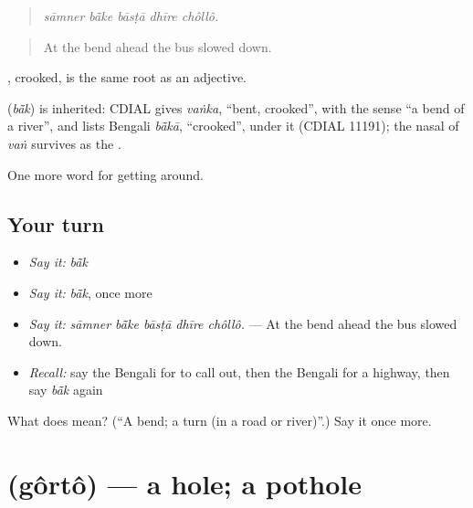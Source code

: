 \begin{quote}
    
\end{quote}

\begin{quote}
\emph{sāmner bā̃ke bāsṭā dhīre chôllô.}
\end{quote}

\begin{quote}
At the bend ahead the bus slowed down.
\end{quote}

, crooked, is the same root as an adjective.

\begin{cousinweb}
\textbf{} (\emph{bā̃k}) is inherited: CDIAL gives \emph{vaṅka}, \textquotedblleft{}bent, crooked\textquotedblright{}, with the sense \textquotedblleft{}a bend of a river\textquotedblright{}, and lists Bengali \emph{bā̃kā}, \textquotedblleft{}crooked\textquotedblright{}, under it (CDIAL 11191); the nasal of \emph{vaṅ} survives as the .
\end{cousinweb}

\begin{grammarlens}[title={What you've built}]
One more word for getting around.
\end{grammarlens}

\subsection*{Your turn}
\begin{itemize}
\raggedright
  \item \emph{Say it:} \emph{bā̃k}
  \item \emph{Say it:} \emph{bā̃k}, once more
  \item \emph{Say it:} \emph{sāmner bā̃ke bāsṭā dhīre chôllô.} — At the bend ahead the bus slowed down.
  \item \emph{Recall:} say the Bengali for to call out, then the Bengali for a highway, then say \emph{bā̃k} again
\end{itemize}

\begin{tcolorbox}[breakable,colback=teal!4,colframe=teal!35!black,title={Before you move on}]
What does  mean? (\textquotedblleft{}A bend; a turn (in a road or river)\textquotedblright{}.) Say it once more.
\end{tcolorbox}
\section[\texorpdfstring{\bn{গর্ত} (gôrtô)}{গর্ত (gôrtô)}]{ (gôrtô) — a hole; a pothole}

